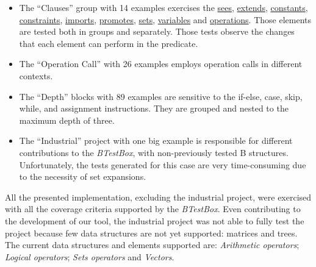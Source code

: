 \documentclass[runningheads]{llncs}
\begin{document}
\begin{itemize}
    \item The ``Clauses'' group with 14 examples exercises the \underline{sees}, \underline{extends}, \underline{constants}, \underline{constraints}, \underline{imports}, \underline{promotes}, \underline{sets}, \underline{variables} and \underline{operations}. Those elements are tested both in groups and separately. Those tests observe the changes that each element can perform in the predicate.
    \item The ``Operation Call'' with 26 examples employs operation calls in different contexts.
    \item The ``Depth'' blocks with 89 examples are sensitive to the if-else, case, skip, while, and assignment instructions. They are grouped and nested to the maximum depth of three.
    \item The ``Industrial'' project with one big example is responsible for different contributions to the \textit{BTestBox}, with non-previously tested B structures. Unfortunately, the tests generated for this case are very time-consuming due to the necessity of set expansions.
\end{itemize}

All the presented implementation, excluding the industrial project, were exercised with all the coverage criteria supported by the \textit{BTestBox}. Even contributing to the development of our tool, the industrial project was not able to fully test the project because few data structures are not yet supported: matrices and trees. 
The current data structures and elements supported are: \textit{Arithmetic operators}; \textit{Logical operators};  \textit{Sets operators} and \textit{Vectors}.
\end{document}
